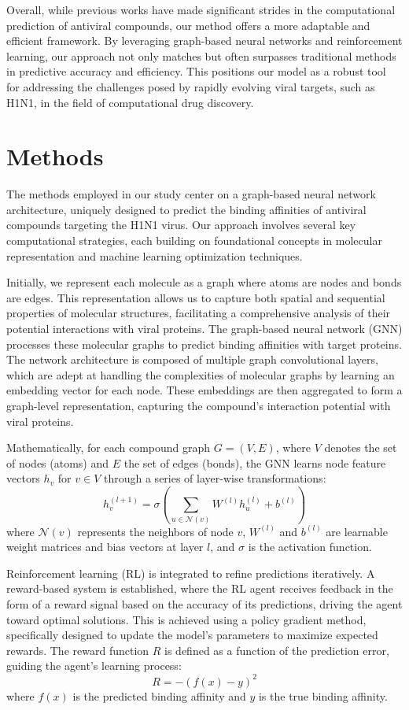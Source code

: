 \documentclass{article}
\begin{document}
Overall, while previous works have made significant strides in the computational prediction of antiviral compounds, our method offers a more adaptable and efficient framework. By leveraging graph-based neural networks and reinforcement learning, our approach not only matches but often surpasses traditional methods in predictive accuracy and efficiency. This positions our model as a robust tool for addressing the challenges posed by rapidly evolving viral targets, such as H1N1, in the field of computational drug discovery.

\section{Methods}
The methods employed in our study center on a graph-based neural network architecture, uniquely designed to predict the binding affinities of antiviral compounds targeting the H1N1 virus. Our approach involves several key computational strategies, each building on foundational concepts in molecular representation and machine learning optimization techniques.

Initially, we represent each molecule as a graph where atoms are nodes and bonds are edges. This representation allows us to capture both spatial and sequential properties of molecular structures, facilitating a comprehensive analysis of their potential interactions with viral proteins. The graph-based neural network (GNN) processes these molecular graphs to predict binding affinities with target proteins. The network architecture is composed of multiple graph convolutional layers, which are adept at handling the complexities of molecular graphs by learning an embedding vector for each node. These embeddings are then aggregated to form a graph-level representation, capturing the compound's interaction potential with viral proteins.

Mathematically, for each compound graph \( G = (V, E) \), where \( V \) denotes the set of nodes (atoms) and \( E \) the set of edges (bonds), the GNN learns node feature vectors \( h_v \) for \( v \in V \) through a series of layer-wise transformations:
\[
h_v^{(l+1)} = \sigma \left( \sum_{u \in \mathcal{N}(v)} W^{(l)} h_u^{(l)} + b^{(l)} \right)
\]
where \( \mathcal{N}(v) \) represents the neighbors of node \( v \), \( W^{(l)} \) and \( b^{(l)} \) are learnable weight matrices and bias vectors at layer \( l \), and \( \sigma \) is the activation function.

Reinforcement learning (RL) is integrated to refine predictions iteratively. A reward-based system is established, where the RL agent receives feedback in the form of a reward signal based on the accuracy of its predictions, driving the agent toward optimal solutions. This is achieved using a policy gradient method, specifically designed to update the model's parameters to maximize expected rewards. The reward function \( R \) is defined as a function of the prediction error, guiding the agent's learning process:
\[
R = - (f(x) - y)^2
\]
where \( f(x) \) is the predicted binding affinity and \( y \) is the true binding affinity.
\end{document}
